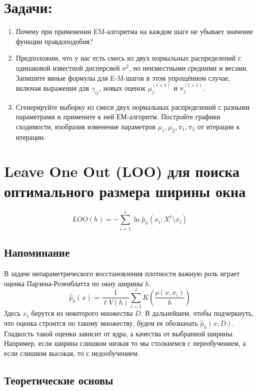 \section*{\textbf{Задачи:}}

\begin{enumerate}
    \item Почему при применении EM-алгоритма на каждом шаге не убывает значение функции правдоподобия?

    \item Предположим, что у нас есть смесь из двух нормальных распределений с одинаковой известной дисперсией $\sigma^2$, но неизвестными средними и весами. Запишите явные формулы для E-M-шагов в этом упрощённом случае, включая выражения для $\gamma_{ij}$, новых оценок $\mu_j^{(t+1)}$ и $\pi_j^{(t+1)}$.

    \item Сгенерируйте выборку из смеси двух нормальных распределений с разными параметрами и примените к ней ЕМ-алгоритм. Постройте графики сходимости, изобразив изменение параметров $\mu_1, \mu_2, \pi_1, \pi_2$ от итерации к итерации.
\end{enumerate}


\section*{Leave One Out (LOO) для поиска оптимального размера ширины окна}

\[
LOO(h) = -\sum_{i=1}^{\ell} \ln \hat{p}_h(x_i; X^\ell \setminus x_i)
\]

\subsection*{Напоминание}

В задаче непараметрического восстановления плотности важную роль играет оценка Парзена-Розенблатта по окну ширины $h$.
\[
\hat{p}_h(x) = \frac{1}{\ell V(h)} \sum_{i=1}^{\ell} K\left(\frac{\rho(x, x_i)}{h}\right)
\]
Здесь $x_i$ берутся из некоторого множества $D$. В дальнейшем, чтобы подчеркнуть, что оценка строится по такому множеству, будем ее обозначать $\hat{p}_h(x; D)$. Гладкость такой оценки зависит от ядра, а качества от выбранной ширины. Например, если ширина слишком низкая то мы столкнемся с переобучением, а если слишком высокая, то с недообучением.

\subsection*{Теоретические основы}

